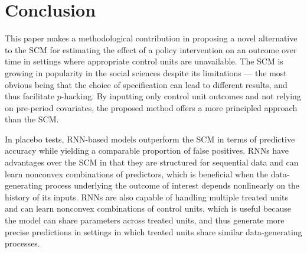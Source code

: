 \documentclass[hidelinks,12pt]{article}
\begin{document}




\section{Conclusion} \label{conclusion}

This paper makes a methodological contribution in proposing a novel alternative to the SCM for estimating the effect of a policy intervention on an outcome over time in settings where appropriate control units are unavailable. The SCM is growing in popularity in the social sciences despite its limitations --- the most obvious being that the choice of specification can lead to different results, and thus facilitate $p$-hacking. By inputting only control unit outcomes and not relying on pre-period covariates, the proposed method offers a more principled approach than the SCM. 

In placebo tests, RNN-based models outperform the SCM in terms of predictive accuracy while yielding a comparable proportion of false positives. RNNs have advantages over the SCM in that they are structured for sequential data and can learn nonconvex combinations of predictors, which is beneficial when the data-generating process underlying the outcome of interest depends nonlinearly on the history of its inputs. RNNs are also capable of handling multiple treated units and can learn nonconvex combinations of control units, which is useful because the model can share parameters across treated units, and thus generate more precise predictions in settings in which treated units share similar data-generating processes.
\end{document}
